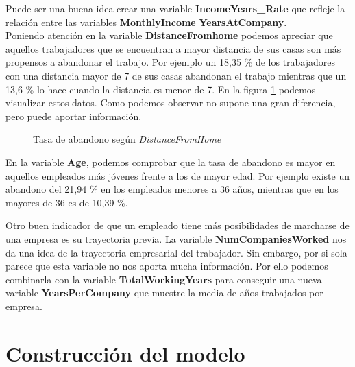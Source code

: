 Puede ser una buena idea crear una variable \textbf{IncomeYears\_Rate} que refleje la relación entre las variables \textbf{MonthlyIncome} \textbf{YearsAtCompany}.\\

Poniendo atención en la variable \textbf{DistanceFromhome} podemos apreciar que aquellos trabajadores que se encuentran a mayor distancia de sus casas son más propensos a abandonar el trabajo.
Por ejemplo un 18,35 \% de los trabajadores con una distancia mayor de 7 de sus casas abandonan el trabajo mientras que un 13,6 \% lo hace cuando la distancia es menor de 7. En la figura \ref{fig:attrition_distance} podemos visualizar estos datos. Como podemos observar no supone una gran diferencia, pero puede aportar información.\\


\begin{figure}
\centering
{}
\qquad
{}
\caption{Tasa de abandono según \textit{DistanceFromHome}}
\label{fig:attrition_distance}
\end{figure}


En la variable \textbf{Age}, podemos comprobar que la tasa de abandono es  mayor en aquellos empleados más jóvenes frente a los de mayor edad.
Por ejemplo existe un abandono del 21,94 \% en los empleados menores a 36 años, mientras que en los mayores de 36 es de 10,39 \%.

Otro buen indicador de que un empleado tiene más posibilidades de marcharse de una empresa es su trayectoria previa. La variable \textbf{NumCompaniesWorked} nos da una idea de la trayectoria empresarial del trabajador.
Sin embargo, por si sola parece que esta variable no nos aporta mucha información. Por ello podemos combinarla con la variable \textbf{TotalWorkingYears} para conseguir una nueva variable \textbf{YearsPerCompany} que muestre la media de años trabajados por empresa.\\





\section{Construcción del modelo}



